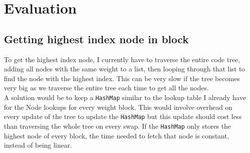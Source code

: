 \documentclass{article}
\newcommand{\n}[0]{\\[\baselineskip]}
\begin{document}
\section{Evaluation}
\subsection{Getting highest index node in block}
To get the highest index node, I currently have to traverse the entire code tree, adding all nodes with the same weight to a list, then looping through that list to find the node with the highest index. This can be very slow if the tree becomes very big as we traverse the entire tree each time to get all the nodes. \n A solution would be to keep a \texttt{HashMap} similar to the lookup table I already have for the Node lookups for every weight block. This would involve overhead on every update of the tree to update the \texttt{HashMap} but this update should cost less than traversing the whole tree on every swap. If the \texttt{HashMap} only stores the highest node of every block, the time needed to fetch that node is constant, instead of being linear. 
\end{document}
